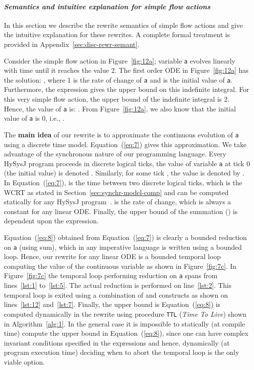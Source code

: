 \documentclass[10pt,journal,cspaper,compsoc]{IEEEtran}
\begin{document}
\paragraph{\textit{Semantics and intuitive explanation for simple flow actions}}
\label{sec:flow-actions-1}

In this section we describe the rewrite semantics of simple flow actions
and give the intuitive explanation for these rewrites. A complete formal
treatment is provided in Appendix~\ref{sec:disc-rewr-semant}. 

Consider the simple flow action in Figure~\ref{fig:12a}; variable
\texttt{a} evolves linearly with time until it reaches the value 2. The
first order ODE in Figure~\ref{fig:12a} has the solution:
\mbox{}, where 1 is the
rate of change of \texttt{a} and  is the initial value of
\texttt{a}. Furthermore, the  expression gives the upper
bound on this indefinite integral. For this very simple flow action, the
upper bound of the indefinite integral is 2. Hence, the value of
\texttt{a} is: . From Figure~\ref{fig:12a}, we
also know that the initial value of \texttt{a} is 0, i.e.,
.



The \textbf{main idea} of our rewrite is to approximate the continuous
evolution of \texttt{a} using a discrete time
model. Equation~(\ref{eq:7}) gives this approximation. We take advantage
of the synchronous nature of our programming language. Every HySysJ
program proceeds in discrete logical ticks, the value of variable
\texttt{a} at tick 0 (the initial value) is denoted . Similarly,
for some tick , the value is denoted by . In
Equation~(\ref{eq:7}),  is the time between two discrete
logical ticks, which is the WCRT as stated in
Section~\ref{sec:synchr-model-comp} and can be computed statically for
any HySysJ program~\cite{wilhelm08}.  is the rate of change, which
is always a constant for any linear ODE. Finally, the upper bound of the
summation () is dependent upon the  expression.

Equation~(\ref{eq:8}) obtained from Equation~(\ref{eq:7}) is clearly a
bounded reduction on \texttt{a} (using sum), which in any imperative
language is written using a bounded loop. Hence, our rewrite for any
linear ODE is a bounded temporal loop computing the value of the
continuous variable as shown in Figure~\ref{fig:7c}. In
Figure~\ref{fig:7c} the temporal loop performing reduction on \texttt{a}
spans from lines~\ref{lst:1} to~\ref{lst:5}. The actual reduction is
performed on line~\ref{lst:2}. This temporal loop is exited using a
combination of  and  constructs as shown
on lines~\ref{lst:12} and~\ref{lst:7}. Finally, the upper bound  is
Equation~(\ref{eq:8}) is computed dynamically in the rewrite using
procedure \texttt{TTL} (\textit{Time To Live}) shown in
Algorithm~\ref{alg:1}. In the general case it is impossible to
statically (at compile time) compute the upper bound  in
Equation~(\ref{eq:8}), since one can have complex invariant conditions
specified in the  expressions and hence, dynamically (at program
execution time) deciding when to abort the temporal loop is the only
viable option.
\end{document}
